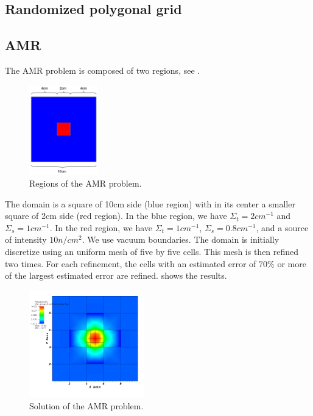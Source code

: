 \subsection{Randomized polygonal grid}
\subsection{AMR}
The AMR problem is composed of two regions, see .
\begin{figure}[H]
  \centering
  \includegraphics[width=3cm]{amr_zones}
  \caption{Regions of the AMR problem.}
  \label{amr_regions}
\end{figure}
The domain is a square of 10cm side (blue region) with in its center a smaller
square of 2cm side (red region). In the blue region, we have
$\Sigma_t=2cm^{-1}$ and $\Sigma_s=1cm^{-1}$. In the red region, we have
$\Sigma_t=1cm^{-1}$, $\Sigma_s=0.8cm^{-1}$, and a source of intensity $10
n/cm^{2}$. We use vacuum boundaries. The domain is initially discretize using
an uniform mesh of five by five cells. This mesh is then refined two
times. For each refinement, the cells with an estimated error of 70\% or more
of the largest estimated error are refined.  shows the
results.
\begin{figure}[H]
  \centering
  \includegraphics[width=5cm]{diffusion_amr}
  \caption{Solution of the AMR problem.}
  \label{diffusion_amr}
\end{figure}
